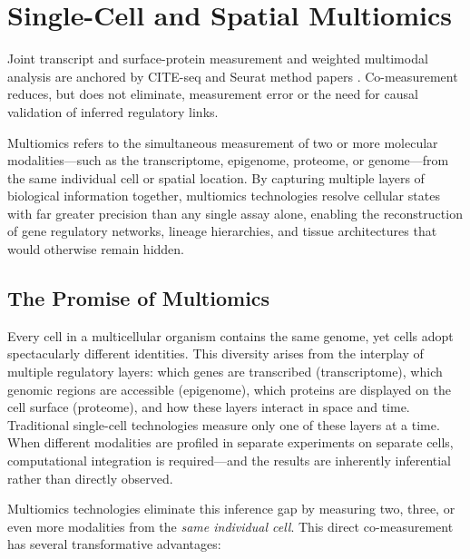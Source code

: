 \chapter{Single-Cell and Spatial Multiomics}
\label{ch:multiomics}

\begin{sourcebox}
Joint transcript and surface-protein measurement and weighted multimodal analysis are anchored by CITE-seq and Seurat method papers \cite{stoeckius2017,hao2021}. Co-measurement reduces, but does not eliminate, measurement error or the need for causal validation of inferred regulatory links.
\end{sourcebox}

\begin{keyconcept}
Multiomics refers to the simultaneous measurement of two or more molecular modalities---such as the transcriptome, epigenome, proteome, or genome---from the same individual cell or spatial location. By capturing multiple layers of biological information together, multiomics technologies resolve cellular states with far greater precision than any single assay alone, enabling the reconstruction of gene regulatory networks, lineage hierarchies, and tissue architectures that would otherwise remain hidden.
\end{keyconcept}

\section{The Promise of Multiomics}
\label{sec:multiomics:promise}

Every cell in a multicellular organism contains the same genome, yet cells adopt spectacularly different identities. This diversity arises from the interplay of multiple regulatory layers: which genes are transcribed (transcriptome), which genomic regions are accessible (epigenome), which proteins are displayed on the cell surface (proteome), and how these layers interact in space and time. Traditional single-cell technologies measure only one of these layers at a time. When different modalities are profiled in separate experiments on separate cells, computational integration is required---and the results are inherently inferential rather than directly observed.

Multiomics technologies eliminate this inference gap by measuring two, three, or even more modalities from the \textit{same individual cell}. This direct co-measurement has several transformative advantages:

